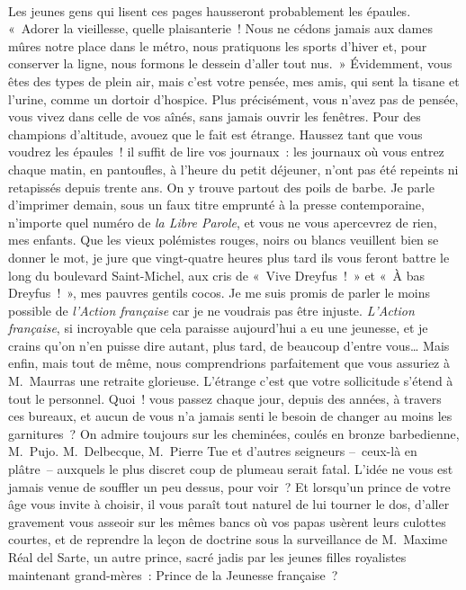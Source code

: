 \documentclass[french,twoside]{book} %
\newcommand{\astertri}{\medskip\par\centerline{\color{rubric}\large\selectfont{\syms ✻\,✻\,✻}}\medskip\par}%
\begin{document}
\astertri

\noindent  \par
Les jeunes gens qui lisent ces pages hausseront probablement les épaules. « Adorer la vieillesse, quelle plaisanterie ! Nous ne cédons jamais aux dames mûres notre place dans le métro, nous pratiquons les sports d’hiver et, pour conserver la ligne, nous formons le dessein d’aller tout nus. » Évidemment, vous êtes des types de plein air, mais c’est votre pensée, mes amis, qui sent la tisane et l’urine, comme un dortoir d’hospice. Plus précisément, vous n’avez pas de pensée, vous vivez dans celle de vos aînés, sans jamais ouvrir les fenêtres. Pour des champions d’altitude, avouez que le fait est étrange. Haussez tant que vous voudrez les épaules ! il suffit de lire vos journaux : les journaux où vous entrez chaque matin, en pantoufles, à l’heure du petit déjeuner, n’ont pas été repeints ni retapissés depuis trente ans. On y trouve partout des poils de barbe. Je parle d’imprimer demain, sous un faux titre emprunté à la presse contemporaine, n’importe quel numéro de \emph{la Libre Parole}, et vous ne vous apercevrez de rien, mes enfants. Que les vieux polémistes rouges, noirs ou blancs veuillent bien se donner le mot, je jure que vingt-quatre heures plus tard ils vous feront battre le long du boulevard Saint-Michel, aux cris de « Vive Dreyfus ! » et « À bas Dreyfus ! », mes pauvres gentils cocos. Je me suis promis de parler le moins possible de \emph{l’Action française} car je ne voudrais pas être injuste. \emph{L’Action française}, si incroyable que cela paraisse aujourd’hui a eu une jeunesse, et je crains qu’on n’en puisse dire autant, plus tard, de beaucoup d’entre vous… Mais enfin, mais tout de même, nous comprendrions parfaitement que vous assuriez à M. Maurras une retraite glorieuse. L’étrange c’est que votre sollicitude s’étend à tout le personnel. Quoi ! vous passez chaque jour, depuis des années, à travers ces bureaux, et aucun de vous n’a jamais senti le besoin de changer au moins les garnitures ? On admire toujours sur les cheminées, coulés en bronze barbedienne, M. Pujo. M. Delbecque, M. Pierre Tue et d’autres seigneurs – ceux-là en plâtre – auxquels le plus discret coup de plumeau serait fatal. L’idée ne vous est jamais venue de souffler un peu dessus, pour voir ? Et lorsqu’un prince de votre âge vous invite à choisir, il vous paraît tout naturel de lui tourner le dos, d’aller gravement vous asseoir sur les mêmes bancs où vos papas usèrent leurs culottes courtes, et de reprendre la leçon de doctrine sous la surveillance de M. Maxime Réal del Sarte, un autre prince, sacré jadis par les jeunes filles royalistes maintenant grand-mères : Prince de la Jeunesse française ?\par
 \par
\end{document}
